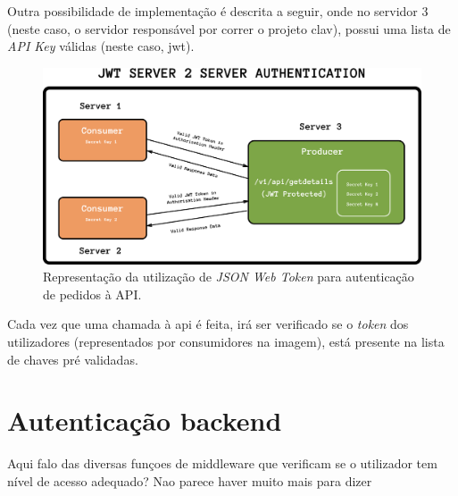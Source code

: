 Outra possibilidade de implementação é descrita a seguir, onde no servidor 3 (neste caso, o servidor responsável por correr o projeto \gls{clav}), possui uma lista de \emph{API Key} válidas (neste caso, \gls{jwt}).

\begin{figure}[h]
    \centering
    \includegraphics[width=\textwidth]{img/jwt/jwtAPI.png}
    \caption{Representação da utilização de \emph{JSON Web Token} para autenticação de pedidos à API. \cite{jwtAPI}}
\end{figure}

Cada vez que uma chamada à \gls{api} é feita, irá ser verificado se o \emph{token} dos utilizadores (representados por consumidores na imagem), está presente na lista de chaves pré validadas.

\cleardoublepage
\section{Autenticação backend}

Aqui falo das diversas funçoes de middleware que verificam se o utilizador tem nível de acesso adequado? Nao parece haver muito mais para dizer